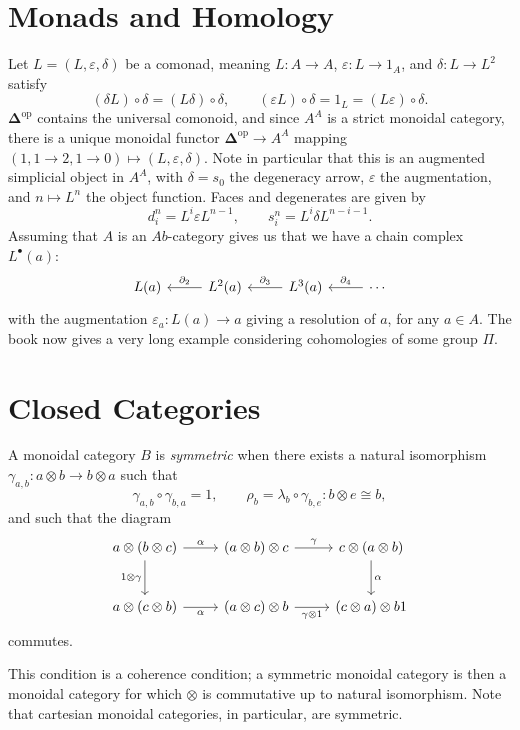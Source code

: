 \section{Monads and Homology}

Let $L=(L,\varepsilon ,\delta)$ be a comonad, meaning $L : A \to A$, $\varepsilon : L \to 1_A$, and $\delta : L \to L^2$ satisfy
\[
	(\delta L)\circ \delta = (L\delta)\circ \delta,\qquad (\varepsilon L)\circ \delta = 1_L = (L\varepsilon )\circ \delta
.\]
$\boldsymbol{\Delta} ^{\mathrm{op} } $ contains the universal comonoid, and since $A^A$ is a strict monoidal category, there is a unique monoidal functor $\boldsymbol{\Delta} ^{\mathrm{op} } \to A^A$ mapping $(1,1\to 2,1\to 0)\mapsto (L,\varepsilon ,\delta)$. Note in particular that this is an augmented simplicial object in $A^A$, with $\delta=s_0$ the degeneracy arrow, $\varepsilon $ the augmentation, and $n\mapsto L^n$ the object function. Faces and degenerates are given by
\[
	d_i^n = L^i \varepsilon L^{n-1} ,\qquad s_i^n = L^i\delta L^{n-i-1} 
.\]
Assuming that $A$ is an $Ab$-category gives us that we have a chain complex $L^{\bullet} (a)$:
\[\begin{tikzcd}[row sep = 2.5em, column sep = 2.5em]
L(a) & L^2(a)\ar[" \partial_2 "', l]  & L^3(a)\ar[" \partial _3 "', l]  & \cdots \ar[" \partial _4 "', l] 
\end{tikzcd}\]
with the augmentation $\varepsilon _a : L(a) \to a$ giving a resolution of $a$, for any $a\in A$. The book now gives a very long example considering cohomologies of some group $\Pi$.

\section{Closed Categories}

\begin{definition}[Symmetric]\label{dfn:7.8}
	A monoidal category $B$ is \emph{symmetric} when there exists a natural isomorphism $\gamma_{a,b} : a\otimes b \to b\otimes a$ such that
	\[
		\gamma_{a,b} \circ \gamma_{b,a} =1,\qquad \rho_b = \lambda_b \circ \gamma_{b,e} : b\otimes e \cong b,
	\]
	and such that the diagram
	\[\begin{tikzcd}[row sep = 2.5em, column sep = 2.5em]
	a\otimes (b\otimes c)\ar[" \alpha ", r] \ar[" 1\otimes \gamma "', d]  & (a\otimes b)\otimes c \ar[" \gamma ", r]  & c\otimes (a\otimes b)\ar[" \alpha ", d]  \\
	a\otimes (c\otimes b)\ar[" \alpha "', r]  & (a\otimes c)\otimes b \ar[" \gamma \otimes 1 "', r]  & (c\otimes a)\otimes b1
	\end{tikzcd}\]
	commutes.
\end{definition}
This condition is a coherence condition; a symmetric monoidal category is then a monoidal category for which $\otimes $ is commutative up to natural isomorphism. Note that cartesian monoidal categories, in particular, are symmetric.

